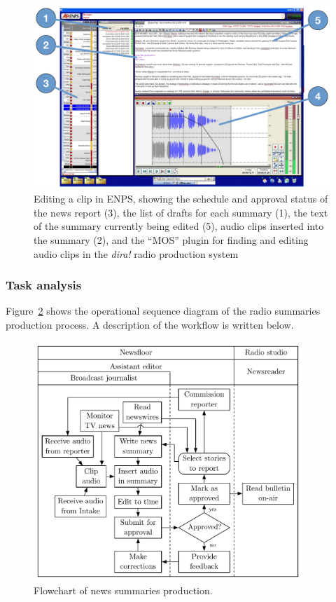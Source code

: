 \begin{figure}[ht]
  \centering
  \includegraphics[width=\columnwidth]{figs/news-enps-labelled.pdf}
  \caption{Editing a clip in ENPS, showing the schedule and approval status of the news report (3), the list of drafts
  for each summary (1), the text of the summary currently being edited (5), audio clips inserted into the summary (2),
  and the ``MOS'' plugin for finding and editing audio clips in the \textit{dira!} radio production system}
  \label{fig:news-enps-edit}
\end{figure}

\subsubsection{Task analysis}
Figure~\ref{fig:news-flowchart} shows the operational sequence diagram of the radio summaries production process. A
description of the workflow is written below.

\begin{figure}[ht]
	\centering
	\includegraphics[width=4in]{figs/news-workflow.pdf}
	\caption{Flowchart of news summaries production.}
	\label{fig:news-flowchart}
\end{figure}

